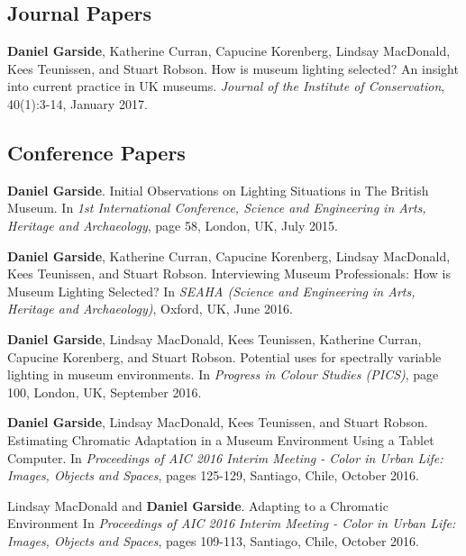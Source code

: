{\parindent0pt \footnotesize


\subsection*{Journal Papers}

\textbf{Daniel Garside}, Katherine Curran, Capucine Korenberg, Lindsay MacDonald, Kees Teunissen, and Stuart Robson. How is museum lighting selected? An insight into current practice in UK museums. \textit{Journal of the Institute of Conservation}, 40(1):3-14, January 2017. 

\subsection*{Conference Papers}

\textbf{Daniel Garside}. Initial Observations on Lighting Situations in The British Museum. In \textit{1st International Conference, Science and Engineering in Arts, Heritage and Archaeology}, page 58, London, UK, July 2015. 
\bigskip

\textbf{Daniel Garside}, Katherine Curran, Capucine Korenberg, Lindsay MacDonald, Kees Teunissen, and Stuart Robson. Interviewing Museum Professionals: How is Museum Lighting Selected? In \textit{SEAHA (Science and Engineering in Arts, Heritage and Archaeology)}, Oxford, UK, June 2016. 
\bigskip

\textbf{Daniel Garside}, Lindsay MacDonald, Kees Teunissen, Katherine Curran, Capucine Korenberg, and Stuart Robson. Potential uses for spectrally variable lighting in museum environments. In \textit{Progress in Colour Studies (PICS)}, page 100, London, UK, September 2016. 
\bigskip

\textbf{Daniel Garside}, Lindsay MacDonald, Kees Teunissen, and Stuart Robson. Estimating Chromatic Adaptation in a Museum Environment Using a Tablet Computer. In
\textit{Proceedings of AIC 2016 Interim Meeting - Color in Urban Life: Images, Objects and Spaces}, pages 125-129, Santiago, Chile, October 2016. 
\bigskip

Lindsay MacDonald and \textbf{Daniel Garside}. Adapting to a Chromatic Environment In \textit{Proceedings of AIC 2016 Interim Meeting - Color in Urban Life: Images, Objects and Spaces}, pages 109-113, Santiago, Chile, October 2016.
\bigskip

}
